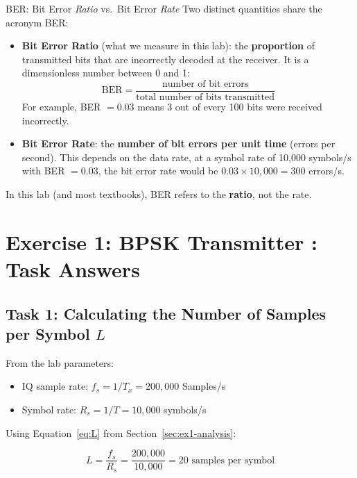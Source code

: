 \begin{IntuitionBox}{BER: Bit Error \textit{Ratio} vs.\ Bit Error \textit{Rate}}
Two distinct quantities share the acronym BER:
\begin{itemize}
\item \textbf{Bit Error Ratio} (what we measure in this lab): the \textbf{proportion} of transmitted bits that are incorrectly decoded at the receiver. It is a dimensionless number between 0 and 1:
\begin{equation*}
\text{BER} = \frac{\text{number of bit errors}}{\text{total number of bits transmitted}}
\end{equation*}
For example, BER $= 0.03$ means 3 out of every 100 bits were received incorrectly.

\item \textbf{Bit Error Rate}: the \textbf{number of bit errors per unit time} (errors per second). This depends on the data rate, at a symbol rate of 10,000 symbols/s with BER $= 0.03$, the bit error rate would be $0.03 \times 10{,}000 = 300$ errors/s.
\end{itemize}
In this lab (and most textbooks), BER refers to the \textbf{ratio}, not the rate.
\end{IntuitionBox}

\newpage

\section{Exercise 1: BPSK Transmitter : Task Answers}
\label{sec:ex1-tasks}

\subsection{Task 1: Calculating the Number of Samples per Symbol $L$}

From the lab parameters:

\begin{itemize}
\item IQ sample rate: $f_s = 1/T_x = 200{,}000$ Samples/s
\item Symbol rate: $R_s = 1/T = 10{,}000$ symbols/s
\end{itemize}

Using Equation~\eqref{eq:L} from Section~\ref{sec:ex1-analysis}:

\begin{equation}
L = \frac{f_s}{R_s} = \frac{200{,}000}{10{,}000} = 20 \text{ samples per symbol}
\end{equation}

